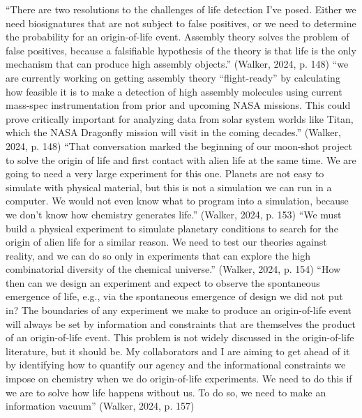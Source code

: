 \markdownRendererUlItem “There are two resolutions to the challenges of life detection I’ve posed. Either we need biosignatures that are not subject to false positives, or we need to determine the probability for an origin-of-life event. Assembly theory solves the problem of false positives, because a falsifiable hypothesis of the theory is that life is the only mechanism that can produce high assembly objects.” (Walker, 2024, p. 148)\markdownRendererUlItemEnd 
\markdownRendererUlItem “we are currently working on getting assembly theory “flight-ready” by calculating how feasible it is to make a detection of high assembly molecules using current mass-spec instrumentation from prior and upcoming NASA missions. This could prove critically important for analyzing data from solar system worlds like Titan, which the NASA Dragonfly mission will visit in the coming decades.” (Walker, 2024, p. 148)\markdownRendererUlItemEnd 
\markdownRendererUlEndTight \markdownRendererInterblockSeparator
{}\markdownRendererInterblockSeparator
{}\markdownRendererUlBeginTight
\markdownRendererUlItem “That conversation marked the beginning of our moon-shot project to solve the origin of life and first contact with alien life at the same time. We are going to need a very large experiment for this one. Planets are not easy to simulate with physical material, but this is not a simulation we can run in a computer. We would not even know what to program into a simulation, because we don’t know how chemistry generates life.” (Walker, 2024, p. 153)\markdownRendererUlItemEnd 
\markdownRendererUlItem “We must build a physical experiment to simulate planetary conditions to search for the origin of alien life for a similar reason. We need to test our theories against reality, and we can do so only in experiments that can explore the high combinatorial diversity of the chemical universe.” (Walker, 2024, p. 154)\markdownRendererUlItemEnd 
\markdownRendererUlItem “How then can we design an experiment and expect to observe the spontaneous emergence of life, e.g., via the spontaneous emergence of design we did not put in? The boundaries of any experiment we make to produce an origin-of-life event will always be set by information and constraints that are themselves the product of an origin-of-life event. This problem is not widely discussed in the origin-of-life literature, but it should be. My collaborators and I are aiming to get ahead of it by identifying how to quantify our agency and the informational constraints we impose on chemistry when we do origin-of-life experiments. We need to do this if we are to solve how life happens without us. To do so, we need to make an information vacuum” (Walker, 2024, p. 157)\markdownRendererUlItemEnd 
